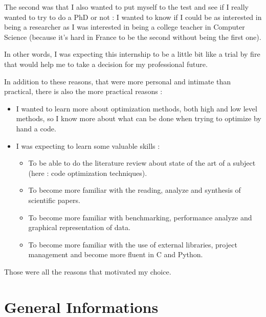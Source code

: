 \documentclass[paper=a4, fontsize=11.5pt]{scrartcl}
\numberwithin{equation}{section}        %
\numberwithin{figure}{section}          %
\numberwithin{table}{section}               %
\begin{document}
The second was that I also wanted to put myself to the test and see if I really 
wanted to try to do a PhD or not : I wanted to know if I could be as interested in being
a researcher as I was interested in being a college teacher in Computer Science
(because it's hard in France to be the second without being the first one).

In other words,
I was expecting this internship to be a little bit like a trial by fire that would help me
to take a decision for my professional future.

\bigskip

In addition to these reasons, that were more personal and intimate than practical, there is
also the more practical reasons :
\begin{itemize}
    \item[] I wanted to learn more about optimization methods, both high and low level methods,
        so I know more about what can be done when trying to optimize by hand a code.
    \item[] I was expecting to learn some valuable skills :
        \begin{itemize}
            \item To be able to do the literature review about state of the art of
                a subject (here : code optimization techniques).
            \item To become more familiar with the reading, analyze and synthesis of
                scientific papers.
            \item To become more familiar with benchmarking, performance analyze and
                graphical representation of data.
            \item To become more familiar with the use of external libraries, project
                management and become more fluent in C and Python.
        \end{itemize}
\end{itemize}

\bigskip

Those were all the reasons that motivated my choice.


\section{General Informations}
\end{document}
